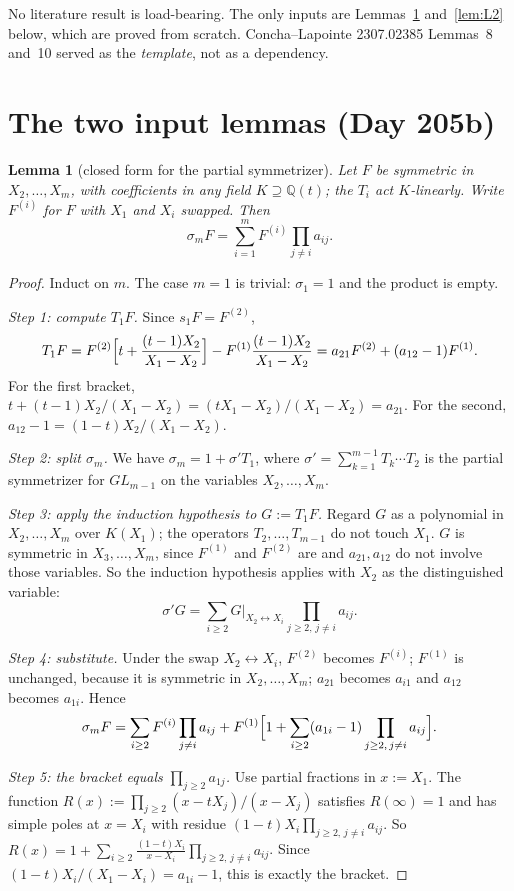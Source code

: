 \documentclass[11pt]{amsart}
\newtheorem{lemma}[theorem]{Lemma}
\theoremstyle{remark}
\begin{document}
No literature result is load-bearing. The only inputs are Lemmas~\ref{lem:L1} and~\ref{lem:L2} below, which are proved from scratch. Concha--Lapointe 2307.02385 Lemmas~8 and~10 served as the \emph{template}, not as a dependency.

\section{The two input lemmas (Day 205b)}\label{sec:lemmas}

\begin{lemma}[closed form for the partial symmetrizer]\label{lem:L1}
Let $F$ be symmetric in $X_2,\dots,X_m$, with coefficients in any field $K\supseteq\mathbb{Q}(t)$; the $T_i$ act $K$-linearly. Write $F^{(i)}$ for $F$ with $X_1$ and $X_i$ swapped. Then
\[
\sigma_mF = \sum_{i=1}^m F^{(i)}\prod_{j\ne i}a_{ij}.
\]
\end{lemma}

\begin{proof}
Induct on $m$. The case $m=1$ is trivial: $\sigma_1=1$ and the product is empty.

\emph{Step 1: compute $T_1F$.} Since $s_1F = F^{(2)}$,
\[
T_1F = F^{(2)}\Bigl[t + \frac{(t-1)X_2}{X_1-X_2}\Bigr] - F^{(1)}\frac{(t-1)X_2}{X_1-X_2} = a_{21}F^{(2)} + (a_{12}-1)F^{(1)}.
\]
For the first bracket, $t + (t-1)X_2/(X_1-X_2) = (tX_1-X_2)/(X_1-X_2) = a_{21}$. For the second, $a_{12}-1 = (1-t)X_2/(X_1-X_2)$.

\emph{Step 2: split $\sigma_m$.} We have $\sigma_m = 1 + \sigma'T_1$, where $\sigma' = \sum_{k=1}^{m-1}T_k\cdots T_2$ is the partial symmetrizer for $GL_{m-1}$ on the variables $X_2,\dots,X_m$.

\emph{Step 3: apply the induction hypothesis to $G := T_1F$.} Regard $G$ as a polynomial in $X_2,\dots,X_m$ over $K(X_1)$; the operators $T_2,\dots,T_{m-1}$ do not touch $X_1$. $G$ is symmetric in $X_3,\dots,X_m$, since $F^{(1)}$ and $F^{(2)}$ are and $a_{21},a_{12}$ do not involve those variables. So the induction hypothesis applies with $X_2$ as the distinguished variable:
\[
\sigma'G = \sum_{i\ge2} G|_{X_2\leftrightarrow X_i}\prod_{j\ge2,\,j\ne i}a_{ij}.
\]

\emph{Step 4: substitute.} Under the swap $X_2\leftrightarrow X_i$, $F^{(2)}$ becomes $F^{(i)}$; $F^{(1)}$ is unchanged, because it is symmetric in $X_2,\dots,X_m$; $a_{21}$ becomes $a_{i1}$ and $a_{12}$ becomes $a_{1i}$. Hence
\[
\sigma_mF = \sum_{i\ge2}F^{(i)}\prod_{j\ne i}a_{ij} + F^{(1)}\Bigl[1 + \sum_{i\ge2}(a_{1i}-1)\prod_{j\ge2,\,j\ne i}a_{ij}\Bigr].
\]

\emph{Step 5: the bracket equals $\prod_{j\ge2}a_{1j}$.} Use partial fractions in $x := X_1$. The function $R(x) := \prod_{j\ge2}(x-tX_j)/(x-X_j)$ satisfies $R(\infty)=1$ and has simple poles at $x=X_i$ with residue $(1-t)X_i\prod_{j\ge2,\,j\ne i}a_{ij}$. So $R(x) = 1 + \sum_{i\ge2}\frac{(1-t)X_i}{x-X_i}\prod_{j\ge2,\,j\ne i}a_{ij}$. Since $(1-t)X_i/(X_1-X_i) = a_{1i}-1$, this is exactly the bracket.
\end{proof}
\end{document}
